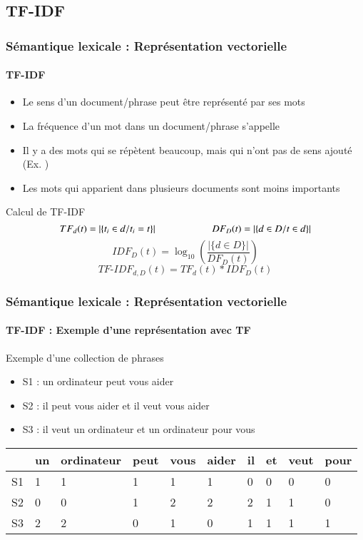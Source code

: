 \documentclass[xcolor=table]{beamer}
\begin{document}
\subsection{TF-IDF}

\begin{frame}
\frametitle{Sémantique lexicale : Représentation vectorielle}
\framesubtitle{TF-IDF}

\begin{itemize}
	\item Le sens d'un document/phrase peut être représenté par ses mots 
	\item La fréquence d'un mot dans un document/phrase s'appelle 
	\item Il y a des mots qui se répètent beaucoup, mais qui n'ont pas de sens ajouté (Ex. )
	\item Les mots qui apparient dans plusieurs documents sont moins importants
\end{itemize}

\begin{block}{Calcul de TF-IDF}
	\[
	TF_d(t) =  |\{t_i \in d / t_i = t\}|
	\hskip2cm 
	DF_D(t) = |\{d \in D / t \in d\}|
	\]
	\[IDF_D(t) = \log_{10} \left( \frac{|\{d \in D\}|}{DF_D(t)} \right)\]
	\[TF\text{-}IDF_{d, D}(t) = TF_d(t) * IDF_D(t)\]
\end{block}

\end{frame}


\begin{frame}
\frametitle{Sémantique lexicale : Représentation vectorielle}
\framesubtitle{TF-IDF : Exemple d'une représentation avec TF}

\begin{exampleblock}{Exemple d'une collection de phrases}
	\begin{itemize}
		\item S1 : un ordinateur peut vous aider
		\item S2 : il peut vous aider et il veut vous aider
		\item S3 : il veut un ordinateur et un ordinateur pour vous
	\end{itemize}
\end{exampleblock}

\begin{center}
	\begin{tabular}{llllllllll}
	\hline\hline
	& un & ordinateur & peut & vous & aider & il & et & veut & pour \\
	\hline
	S1 & 1 & 1 & 1 & 1 & 1 & 0 & 0 & 0 & 0\\
	S2 & 0 & 0 & 1 & 2 & 2 & 2 & 1 & 1 & 0\\
	S3 & 2 & 2 & 0 & 1 & 0 & 1 & 1 & 1 & 1\\
	\hline\hline
\end{tabular}
\end{center}

\end{frame}
\end{document}

